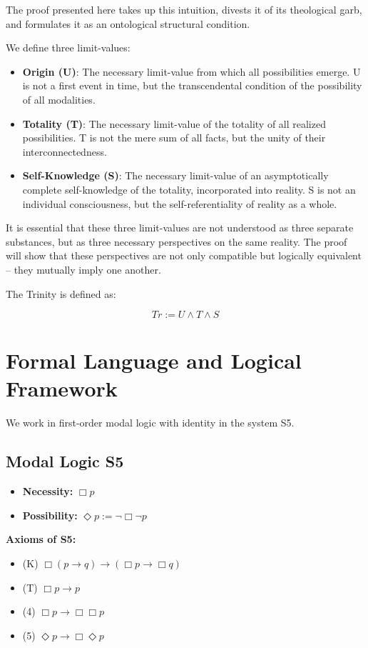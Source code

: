 \documentclass[
]{article}
\begin{document}
The proof presented here takes up this intuition, divests it of its theological garb, and formulates it as an ontological structural condition.

We define three limit-values:

\begin{itemize}
\item \textbf{Origin (U)}: The necessary limit-value from which all possibilities emerge. U is not a first event in time, but the transcendental condition of the possibility of all modalities.
\item \textbf{Totality (T)}: The necessary limit-value of the totality of all realized possibilities. T is not the mere sum of all facts, but the unity of their interconnectedness.
\item \textbf{Self-Knowledge (S)}: The necessary limit-value of an asymptotically complete self-knowledge of the totality, incorporated into reality. S is not an individual consciousness, but the self-referentiality of reality as a whole.
\end{itemize}

It is essential that these three limit-values are not understood as three separate substances, but as three necessary perspectives on the same reality. The proof will show that these perspectives are not only compatible but logically equivalent -- they mutually imply one another.

The Trinity is defined as:

\[
Tr := U \land T \land S
\]

\section{Formal Language and Logical Framework}\label{formal-language-and-logical-framework}

We work in first-order modal logic with identity in the system S5.

\subsection{Modal Logic S5}\label{modal-logic-s5}

\begin{itemize}
\item \textbf{Necessity:} \(\Box p\)
\item \textbf{Possibility:} \(\Diamond p := \neg\Box\neg p\)
\end{itemize}

\textbf{Axioms of S5:}
\begin{itemize}
\item (K) \(\Box(p \rightarrow q) \rightarrow (\Box p \rightarrow \Box q)\)
\item (T) \(\Box p \rightarrow p\)
\item (4) \(\Box p \rightarrow \Box\Box p\)
\item (5) \(\Diamond p \rightarrow \Box\Diamond p\)
\end{itemize}
\end{document}
